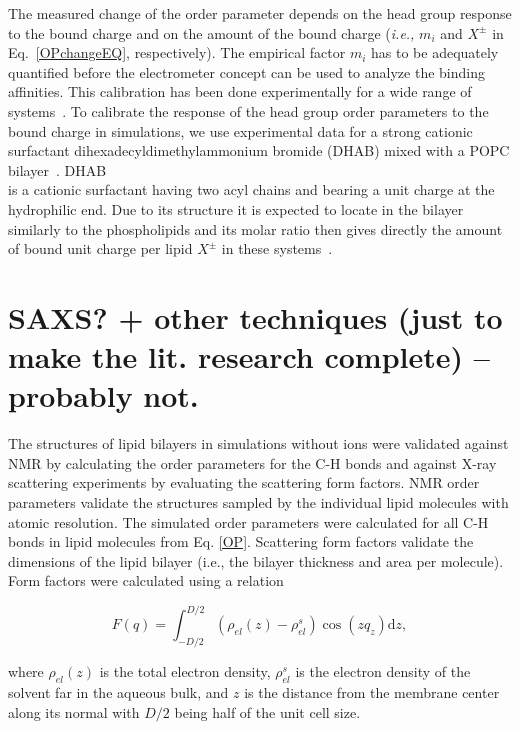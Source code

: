  
The measured change of the order parameter depends on the head group response to the bound charge and on the amount of the bound charge (\textit{i.e.,} $m_i$ and $X^\pm$ in Eq.~\ref{OPchangeEQ}, respectively).  
The empirical factor $m_i$ has to be adequately quantified before the electrometer concept can be used to analyze the binding affinities. 
This calibration has been done experimentally for a wide range of systems~\cite{seelig87, beschiasvili91}. 
To calibrate the response of the head group order parameters to the bound charge in simulations, we use experimental data for a strong cationic surfactant dihexadecyldimethylammonium bromide  (DHAB) mixed with a POPC bilayer~\cite{scherer89}. DHAB\\[0.5cm] 
is a cationic surfactant having two acyl chains and bearing a unit charge at the hydrophilic end. 
Due to its structure it is expected to locate in the bilayer similarly to the phospholipids and its molar ratio then gives directly the amount of bound unit charge per lipid $X^\pm$ in these systems~\cite{scherer89}. 
 
\section{SAXS? + other techniques (just to make the lit. research complete) -- probably not.}

The structures of lipid bilayers in simulations without ions were validated against NMR by calculating the order parameters for the C-H bonds and against \mbox{X-ray} scattering experiments by evaluating the scattering form factors. 
NMR order parameters validate the structures sampled by the individual lipid molecules with atomic resolution. 
The simulated order parameters were calculated for all C-H bonds in lipid molecules from Eq. \ref{OP}. 
Scattering form factors validate the dimensions of the lipid bilayer (i.e., the bilayer thickness and area per molecule). 
Form factors were calculated using a relation 
 
\begin{equation} 
  F(q) = \int _{-D/2} ^{D/2} \left ( \rho_{el}(z) - \rho_{el}^s \right ) \cos (zq_z) \mathrm{d}z, 
\end{equation} 
 
\noindent where $\rho_{el} (z)$ is the total electron density, $\rho_{el}^s$ is the electron density of the solvent far in the aqueous bulk, and $z$ is the distance from the membrane center along its normal with $D/2$ being half of the unit cell size.   

